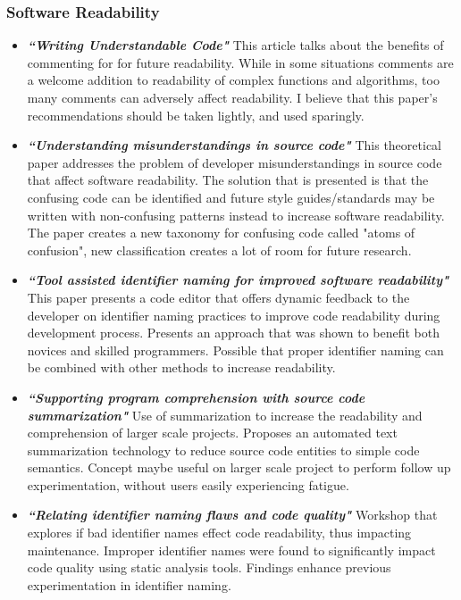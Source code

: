 \documentclass[a4paper, 10pt]{IEEEtran}
\begin{document}
\subsubsection{Software Readability}
\begin{itemize}
    \item \textbf{\textit{“Writing Understandable Code"}}
    This article talks about the benefits of commenting for for future readability. While in some situations comments are a welcome addition to readability of complex functions and algorithms, too many comments can adversely affect readability. I believe that this paper's recommendations should be taken lightly, and used sparingly.
    \item \textbf{\textit{“Understanding  misunderstandings  in  source  code"}}
This theoretical paper addresses the problem of developer misunderstandings in source code that affect software readability. The solution that is presented is that the confusing code can be identified and future style guides/standards may be written with non-confusing patterns instead to increase software readability. The paper    creates a new taxonomy for confusing code called "atoms of confusion", new classification creates a lot of room for future research.
    \item \textbf{\textit{“Tool assisted identifier naming for improved software readability"}}
    This paper presents a code editor that offers dynamic feedback to the developer on identifier naming practices to improve code readability during development process. Presents an approach that was shown to benefit both novices and skilled programmers. Possible that proper identifier naming can be combined with other methods to increase readability.
    \item \textbf{\textit{“Supporting program comprehension with source code summarization"}}
    Use of summarization to increase the readability and comprehension of larger scale projects. Proposes an automated text summarization technology to reduce source code entities to simple code semantics. Concept maybe useful on larger scale project to perform follow up experimentation, without users easily experiencing fatigue.
    \item \textbf{\textit{“Relating identifier naming flaws and code quality"}}
    Workshop that explores if bad identifier names effect code readability, thus impacting maintenance. Improper identifier names were found to significantly impact code quality using static analysis tools. Findings enhance previous experimentation in identifier naming. 

\end{itemize}
\end{document}
